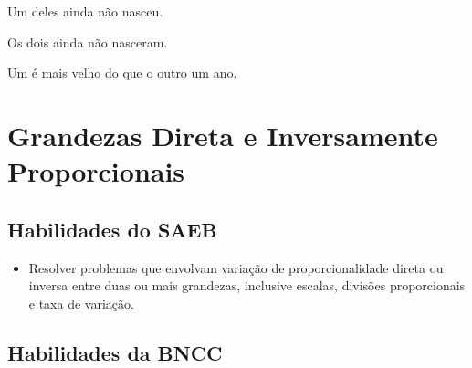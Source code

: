 \begin{escolha}
\begin{boxmedio}
\begin{boxmedio}
{\begin{boxpeq}
\begin{boxpeq}
{\begin{boxpeq}
\begin{boxmedio}
\begin{boxmedio}
\begin{boxpeq}
\begin{boxmedio}
\begin{boxpeq}
\begin{boxpeq}
\begin{boxpeq}
\begin{boxpeq}
\begin{boxmedio}
{\begin{boxmedio}
\begin{boxmedio}
\begin{boxpeq}
\begin{boxmedio}
\begin{boxpeq}
\begin{boxpeq}
\begin{boxpeq}
\begin{escolha}
{\begin{boxmedio}
\begin{boxpeq}
\begin{boxpeq}
\begin{boxpeq}
\begin{boxpeq}
\begin{boxpeq}
\begin{boxmedio}
\begin{boxpeq}
\begin{boxpeq}
\begin{boxpeq}
\begin{escolha}
  \item Um deles ainda não nasceu.

  \item Os dois ainda não nasceram.

  \item Um é mais velho do que o outro um ano.
\end{escolha}


\chapter{Grandezas Direta e Inversamente Proporcionais}

\section{Habilidades do SAEB}

\begin{itemize}

  \item Resolver problemas que envolvam variação de proporcionalidade direta
ou inversa entre duas ou mais grandezas, inclusive escalas, divisões
proporcionais e taxa de variação.   

\end{itemize} 

\section{Habilidades da BNCC}


\end{boxpeq}
\end{boxpeq}
\end{boxpeq}
\end{boxmedio}
\end{boxpeq}
\end{boxpeq}
\end{boxpeq}
\end{boxpeq}
\end{boxpeq}
\end{boxmedio}}
\end{escolha}
\end{boxpeq}
\end{boxpeq}
\end{boxpeq}
\end{boxmedio}
\end{boxpeq}
\end{boxmedio}
\end{boxmedio}}
\end{boxmedio}
\end{boxpeq}
\end{boxpeq}
\end{boxpeq}
\end{boxpeq}
\end{boxmedio}
\end{boxpeq}
\end{boxmedio}
\end{boxmedio}
\end{boxpeq}}
\end{boxpeq}
\end{boxpeq}}
\end{boxmedio}
\end{boxmedio}
\end{escolha}
